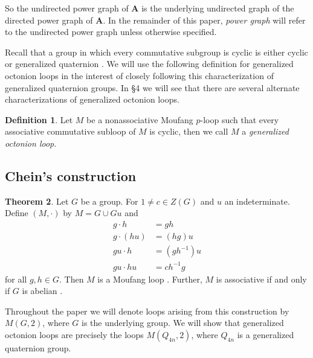 \documentclass[12pt, twoside, openright]{report}
\theoremstyle{definition}
\newtheorem{thm}{Theorem}[chapter]
\newtheorem{dfn}[thm]{Definition}
\begin{document}
So the undirected power graph of \textbf{A} is the underlying undirected graph of the directed power graph of
  \textbf{A}. In the remainder of this paper, \textit{power graph} will refer to the undirected power graph
  unless otherwise specified.

Recall that a group in which every commutative subgroup is cyclic is either cyclic or generalized quaternion
  \cite{Cartan}. We will use the following definition for generalized octonion loops in the interest of closely
  following this characterization of generalized quaternion groups. In {\S}4 we will see that there are several
  alternate characterizations of generalized octonion loops.

\begin{dfn}
	Let $M$ be a nonassociative Moufang $p$-loop such that every associative commutative subloop of $M$ is cyclic,
    then we call $M$ a \textit{generalized octonion loop}.
\end{dfn}

\subsection{Chein's construction}

\begin{thm}\label{cnst-chein}
  Let $G$ be a group. For $1\neq c\in Z(G)$ and $u$ an indeterminate. Define $(M, \cdot)$ by $M = G\cup Gu$ and
  \begin{align*}
    g\cdot h &= gh\\
    g\cdot (hu) &= (hg)u\\
    gu\cdot h &= (gh^{-1})u\\
    gu\cdot hu &= ch^{-1}g
  \end{align*}
  for all $g, h\in G$. Then $M$ is a Moufang loop \cite{Chein}. Further, $M$ is associative if and only if $G$
    is abelian \cite{Chein}.
\end{thm}

Throughout the paper we will denote loops arising from this construction by $M(G, 2)$, where $G$ is the underlying
  group. We will show that generalized octonion loops are precisely the loops $M(Q_{4n}, 2)$, where $Q_{4n}$ is
  a generalized quaternion group.
\end{document}
